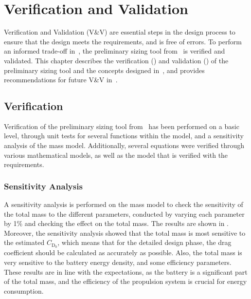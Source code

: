 \chapter{Verification and Validation}
\label{ch:VerificationValidation}
Verification and Validation (V\&V) are essential steps in the design process to ensure that the design meets the requirements, and is free of errors.
To perform an informed trade-off in~, the preliminary sizing tool from~ is verified and validated.
This chapter describes the verification () and validation () of the preliminary sizing tool and the concepts designed in~, and provides recommendations for future V\&V in~.

\section{Verification}\label{sec:Verification}
Verification of the preliminary sizing tool from~ has been performed on a basic level, through unit tests for several functions within the model, and
a sensitivity analysis of the mass model.
Additionally, several equations were verified through various mathematical models, as well as the model that is verified with the requirements.








\subsection{Sensitivity Analysis}
A sensitivity analysis is performed on the mass model to check the sensitivity of the total mass to the different parameters, conducted by varying each parameter by 1\% and checking the effect on the total mass.
The results are shown in .
Moreover, the sensitivity analysis showed that the total mass is most sensitive to the estimated $C_{\text{D}_{\text{0}}}$, which means that for the detailed design phase, the drag coefficient should be calculated as accurately as possible.
Also, the total mass is very sensitive to the battery energy density, and some efficiency parameters.
These results are in line with the expectations, as the battery is a significant part of the total mass, and the efficiency of the propulsion system is crucial for energy consumption.


